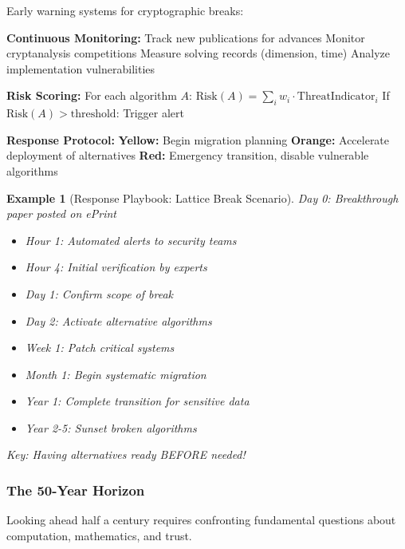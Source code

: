 \documentclass[11pt,a4paper]{article}
\newtheorem{example}{Example}
\begin{document}
Early warning systems for cryptographic breaks:

\begin{algorithm}
\caption{Cryptographic Health Monitoring System}
\label{alg:crypto-monitor}
\begin{algorithmic}[1]
\State \textbf{Continuous Monitoring:}
\State \quad Track new publications for advances
\State \quad Monitor cryptanalysis competitions
\State \quad Measure solving records (dimension, time)
\State \quad Analyze implementation vulnerabilities

\State \textbf{Risk Scoring:}
\State \quad For each algorithm $A$:
\State \quad \quad $\text{Risk}(A) = \sum_i w_i \cdot \text{ThreatIndicator}_i$
\State \quad \quad If $\text{Risk}(A) > \text{threshold}$: Trigger alert

\State \textbf{Response Protocol:}
\State \quad \textbf{Yellow:} Begin migration planning
\State \quad \textbf{Orange:} Accelerate deployment of alternatives
\State \quad \textbf{Red:} Emergency transition, disable vulnerable algorithms
\end{algorithmic}
\end{algorithm}

\begin{example}[Response Playbook: Lattice Break Scenario]
Day 0: Breakthrough paper posted on ePrint
\begin{itemize}
    \item Hour 1: Automated alerts to security teams
    \item Hour 4: Initial verification by experts
    \item Day 1: Confirm scope of break
    \item Day 2: Activate alternative algorithms
    \item Week 1: Patch critical systems
    \item Month 1: Begin systematic migration
    \item Year 1: Complete transition for sensitive data
    \item Year 2-5: Sunset broken algorithms
\end{itemize}
Key: Having alternatives ready BEFORE needed!
\end{example}

\subsubsection{The 50-Year Horizon}

Looking ahead half a century requires confronting fundamental questions about computation, mathematics, and trust.
\end{document}
